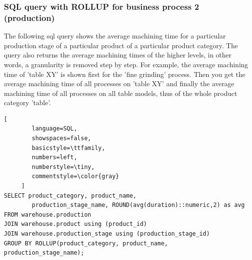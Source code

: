 \documentclass[letterpaper,12pt]{article}
\begin{document}
\endgroup

\subsubsection{SQL query with ROLLUP for business process 2 (production)}

The following sql query shows the average machining time for a particular production stage of a particular product of a particular product category. The query also returns the average machining times of the higher levels, in other words, a granularity is removed step by step. For example, the average machining time of 'table XY' is shown first for the 'fine grinding' process. Then you get the average machining time of all processes on 'table XY' and finally the average machining time of all processes on all table models, thus of the whole product category 'table'.

\begin{lstlisting}[
        language=SQL,
        showspaces=false,
        basicstyle=\ttfamily,
        numbers=left,
        numberstyle=\tiny,
        commentstyle=\color{gray}
     ]
SELECT product_category, product_name, 
        production_stage_name, ROUND(avg(duration)::numeric,2) as avg
FROM warehouse.production
JOIN warehouse.product using (product_id)
JOIN warehouse.production_stage using (production_stage_id)
GROUP BY ROLLUP(product_category, product_name, production_stage_name);
\end{lstlisting}    
\end{document}
